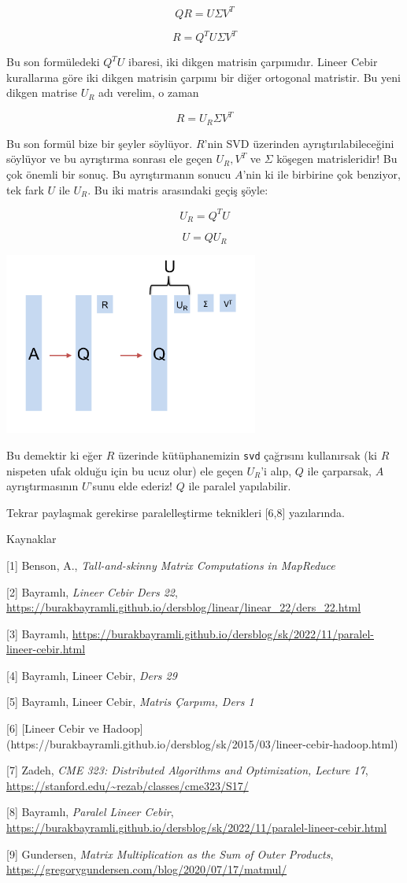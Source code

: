 \documentclass[12pt,fleqn]{article}\usepackage{../../common}
\begin{document}
$$ QR =  U \Sigma V^T $$

$$ R = Q^T U \Sigma V^T $$

Bu son formüledeki $Q^TU$ ibaresi, iki dikgen matrisin çarpımıdır. Lineer Cebir
kurallarına göre iki dikgen matrisin çarpımı bir diğer ortogonal matristir. Bu
yeni dikgen matrise $U_R$ adı verelim, o zaman

$$ R = U_R \Sigma V^T $$

Bu son formül bize bir şeyler söylüyor. $R$'nin SVD üzerinden
ayrıştırılabileceğini söylüyor ve bu ayrıştırma sonrası ele geçen $U_R,V^T$ ve
$\Sigma$ köşegen matrisleridir! Bu çok önemli bir sonuç.  Bu ayrıştırmanın
sonucu $A$'nin ki ile birbirine çok benziyor, tek fark $U$ ile $U_R$. Bu iki
matris arasındaki geçiş şöyle:

$$ U_R = Q^T U $$ 

$$ U = QU_R $$ 

\includegraphics[height=6cm]{ur.png}

Bu demektir ki eğer $R$ üzerinde kütüphanemizin \verb!svd!  çağrısını
kullanırsak (ki $R$ nispeten ufak olduğu için bu ucuz olur) ele geçen $U_R$'i
alıp, $Q$ ile çarparsak, $A$ ayrıştırmasının $U$'sunu elde ederiz! $Q$ ile
paralel yapılabilir.

Tekrar paylaşmak gerekirse paralelleştirme teknikleri [6,8] yazılarında.

Kaynaklar

[1] Benson, A., {\em Tall-and-skinny Matrix Computations in MapReduce}

[2] Bayramlı, {\em Lineer Cebir Ders 22},
     \url{https://burakbayramli.github.io/dersblog/linear/linear_22/ders_22.html}

[3] Bayramlı, \url{https://burakbayramli.github.io/dersblog/sk/2022/11/paralel-lineer-cebir.html}     

[4] Bayramlı, Lineer Cebir, {\em Ders 29}

[5] Bayramlı, Lineer Cebir, {\em Matris Çarpımı, Ders 1}

[6] [Lineer Cebir ve Hadoop](https://burakbayramli.github.io/dersblog/sk/2015/03/lineer-cebir-hadoop.html)

[7] Zadeh, {\em CME 323: Distributed Algorithms and Optimization, Lecture 17},
    \url{https://stanford.edu/~rezab/classes/cme323/S17/}

[8] Bayramlı, {\em Paralel Lineer Cebir},
    \url{https://burakbayramli.github.io/dersblog/sk/2022/11/paralel-lineer-cebir.html}

[9] Gundersen, {\em Matrix Multiplication as the Sum of Outer Products},
    \url{https://gregorygundersen.com/blog/2020/07/17/matmul/}
\end{document}
